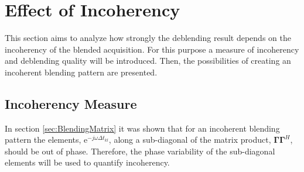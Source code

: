 \FloatBarrier

\section{Effect of Incoherency} \label{sec:Effect-of-Incoherency}

This section aims to analyze how strongly the deblending result depends on the incoherency of the blended acquisition. For this purpose a measure of incoherency and deblending quality will be introduced. Then, the possibilities of creating an incoherent blending pattern are presented.

\subsection*{Incoherency Measure}



In section \ref{sec:BlendingMatrix} it was shown that for an incoherent blending pattern the elements, $\mathrm{e}^{-j \omega \Delta t_{kl}}$, along a sub-diagonal of the matrix product, $\mathbf{\Gamma \Gamma}^H$, should be out of phase. Therefore, the phase variability of the sub-diagonal elements will be used to quantify incoherency. 

